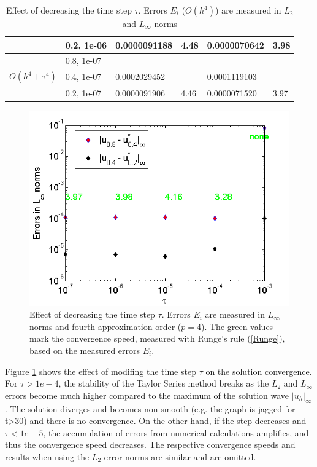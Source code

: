\documentclass[%
 aip,
cp,  
 amsmath,amssymb,
 reprint,
]{iopconfser}
\newcommand{\rf}[1]{(\ref{#1})}
\begin{document}
\begin{table}[ht]
\begin{tabular}{||c|l|ll|ll||}
                    &0.2, 1e-06  & 0.0000091188 & 4.48  &0.0000070642 &      3.98    \\
    \hline
                    &0.8, 1e-07          &              &              &                     &      \\
       $O(h^4 + \tau^ 4)$                  &0.4, 1e-07          &0.0002029452 &            & 0.0001119103    &       \\
   &0.2, 1e-07  & 0.0000091906 & 4.46  &0.0000071520 &       3.97    \\
    \hline
			\hline 
		\end{tabular}
		\caption{Effect of decreasing the time step $\tau$. Errors $E_i$ ($O(h^{4})$) are measured in $L_2$ and $L_\infty$ norms}
\label{tableConvSeq}
\end{table}
\fi

\begin{figure}[ht]\vspace{0.2cm}
  \centering
  \includegraphics[width=0.5\linewidth]{ConvergenceDecreaseTau.png}
\caption{Effect of decreasing the time step $\tau$. Errors $E_i$ are measured in $L_\infty$ norms and fourth approximation order ($p=4$). The green values mark the convergence speed, measured with Runge's rule \rf{Runge}, based on the measured errors $E_i$.}
\label{figConvSeq}
\end{figure}
Figure \ref{figConvSeq} shows the effect of modifing the time step $\tau$ on the solution convergence. For $\tau>1e-4$, the stability of the Taylor Series method breaks as the $L_2$ and $L_\infty$ errors become much higher compared to the maximum of the solution wave $|u_h|_\infty$. The solution diverges and becomes non-smooth (e.g. the graph is jagged for t>30) and there is no convergence. On the other hand, if the step decreases and $\tau<1e-5$, the accumulation of errors from numerical calculations amplifies, and thus the convergence speed decreases. The respective convergence speeds and results when using the $L_2$ error norms are similar and are omitted.
\end{document}
